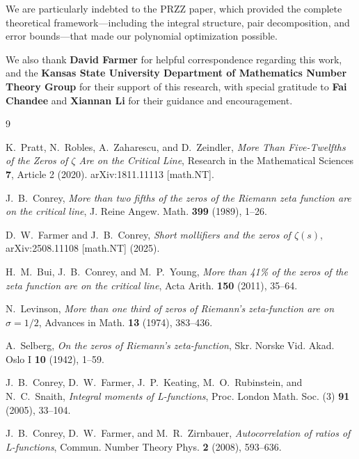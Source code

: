 \documentclass[11pt]{article}
\begin{document}
We are particularly indebted to the PRZZ paper, which provided the complete theoretical framework---including the integral structure, pair decomposition, and error bounds---that made our polynomial optimization possible.

We also thank \textbf{David Farmer} for helpful correspondence regarding this work, and the \textbf{Kansas State University Department of Mathematics Number Theory Group} for their support of this research, with special gratitude to \textbf{Fai Chandee} and \textbf{Xiannan Li} for their guidance and encouragement.

\begin{thebibliography}{9}

K.~Pratt, N.~Robles, A.~Zaharescu, and D.~Zeindler,
\textit{More Than Five-Twelfths of the Zeros of $\zeta$ Are on the Critical Line},
Research in the Mathematical Sciences \textbf{7}, Article 2 (2020).
arXiv:1811.11113 [math.NT].

J.~B.~Conrey,
\textit{More than two fifths of the zeros of the Riemann zeta function are on the critical line},
J. Reine Angew. Math. \textbf{399} (1989), 1--26.

D.~W.~Farmer and J.~B.~Conrey,
\textit{Short mollifiers and the zeros of $\zeta(s)$},
arXiv:2508.11108 [math.NT] (2025).

H.~M.~Bui, J.~B.~Conrey, and M.~P.~Young,
\textit{More than 41\% of the zeros of the zeta function are on the critical line},
Acta Arith. \textbf{150} (2011), 35--64.

N.~Levinson,
\textit{More than one third of zeros of Riemann's zeta-function are on $\sigma = 1/2$},
Advances in Math. \textbf{13} (1974), 383--436.

A.~Selberg,
\textit{On the zeros of Riemann's zeta-function},
Skr. Norske Vid. Akad. Oslo I \textbf{10} (1942), 1--59.

J.~B.~Conrey, D.~W.~Farmer, J.~P.~Keating, M.~O.~Rubinstein, and N.~C.~Snaith,
\textit{Integral moments of L-functions},
Proc. London Math. Soc. (3) \textbf{91} (2005), 33--104.

J.~B.~Conrey, D.~W.~Farmer, and M.~R.~Zirnbauer,
\textit{Autocorrelation of ratios of L-functions},
Commun. Number Theory Phys. \textbf{2} (2008), 593--636.

\end{thebibliography}
\end{document}
